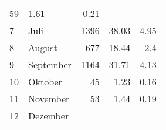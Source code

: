 \begin{longtable}{lXrrr}
       \num{59} &
       \num[round-mode=places,round-precision=2]{1.61} &
         \num[round-mode=places,round-precision=2]{0.21} \\

     7 &
     \multicolumn{1}{X}{ Juli   } &


       \num{1396} &
       \num[round-mode=places,round-precision=2]{38.03} &
         \num[round-mode=places,round-precision=2]{4.95} \\

     8 &
     \multicolumn{1}{X}{ August   } &


       \num{677} &
       \num[round-mode=places,round-precision=2]{18.44} &
         \num[round-mode=places,round-precision=2]{2.4} \\

     9 &
     \multicolumn{1}{X}{ September   } &


       \num{1164} &
       \num[round-mode=places,round-precision=2]{31.71} &
         \num[round-mode=places,round-precision=2]{4.13} \\

     10 &
     \multicolumn{1}{X}{ Oktober   } &


       \num{45} &
       \num[round-mode=places,round-precision=2]{1.23} &
         \num[round-mode=places,round-precision=2]{0.16} \\

     11 &
     \multicolumn{1}{X}{ November   } &


       \num{53} &
       \num[round-mode=places,round-precision=2]{1.44} &
         \num[round-mode=places,round-precision=2]{0.19} \\

     12 &
     \multicolumn{1}{X}{ Dezember   } &



\end{longtable}
